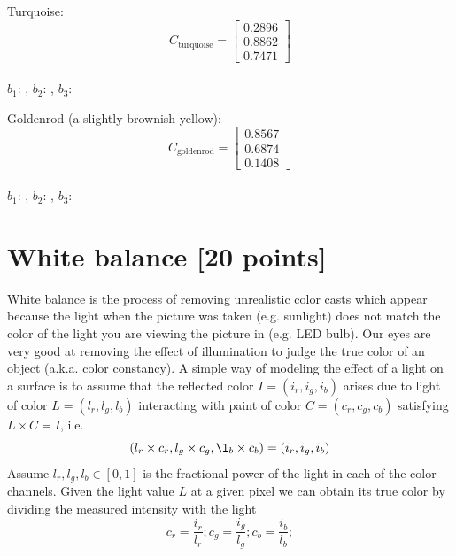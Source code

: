 \documentclass[10pt,letterpaper]{article}
\begin{document}
\begin{enumerate}
Turquoise: 
\[
C_{\text{turquoise}} = \left[ \begin{array}{c} 0.2896 \\ 0.8862 \\ 0.7471 \end{array} \right]
\]\\

$b_1$: \underline{\hspace{3cm}}, $b_2$: \underline{\hspace{3cm}}, $b_3$:\underline{\hspace{3cm}}

\vspace{0.5in}
Goldenrod (a slightly brownish yellow): 
\[
C_{\text{goldenrod}} = \left[ \begin{array}{c} 0.8567 \\ 0.6874 \\ 0.1408 \end{array} \right]
\]\\

$b_1$: \underline{\hspace{3cm}}, $b_2$: \underline{\hspace{3cm}}, $b_3$:\underline{\hspace{3cm}}

\end{enumerate}


\section{White balance [20 points]}
White balance is the process of removing unrealistic color casts which appear because the light when the picture was taken (e.g. sunlight) does not match the color of the light you are viewing the picture in (e.g. LED bulb). Our eyes are very good at removing the effect of illumination to judge the true color of an object (a.k.a. color constancy). A simple way of modeling the effect of a light on a surface is to assume that the reflected color $I = (i_r,i_g,i_b)$ arises due to light of color $L= (l_r,l_g,l_b)$ interacting with paint of color $C = (c_r,c_g,c_b)$ satisfying  
	$L \times C = I$, i.e. 
	\[ (l_r \times c_r,l_g \times c_g ,\l_b \times c_b) = (i_r,i_g,i_b)
	\]
Assume $l_r, l_g, l_b \in [0, 1]$ is the fractional power of the light in each of the color channels. Given the light value $L$ at a given pixel we can obtain its true color by dividing the measured intensity with the light 
\[
	c_r = \frac{i_r}{l_r}; 
	c_g = \frac{i_g}{l_g}; 
	c_b = \frac{i_b}{l_b}; 
\]
\end{document}
